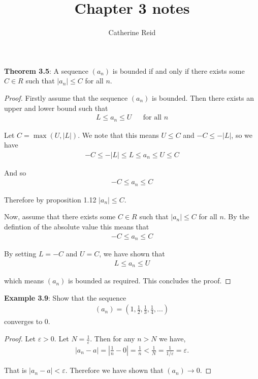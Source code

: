 \documentclass{article}
\author{Catherine Reid}
\title{Chapter 3 notes}
\date{}
\begin{document}
\maketitle

\textbf{Theorem 3.5}: A sequence $(a_n)$ is bounded if and only if there exists some $C \in R$ such that $|a_n| \leq C$ for all $n$.

\begin{proof}
	Firstly assume that the sequence $(a_n)$ is bounded. Then there exists an upper and lower bound such that
	\begin{align*}
		L \leq a_n \leq U &  & \text{for all }n
	\end{align*}

	Let $C = \max(U, |L|)$. We note that this means $U \leq C$ and $-C \leq -|L|$, so we have
	\begin{align*}
		-C \leq -|L| \leq L \leq a_n \leq U \leq C
	\end{align*}

	And so
	\begin{align*}
		-C \leq a_n \leq C
	\end{align*}

	Therefore by proposition 1.12 $|a_n| \leq C$.

	Now, assume that there exists some $C \in R$ such that $|a_n| \leq C$ for all $n$.  By the defintion of the absolute value this means that
	\begin{align*}
		-C \leq a_n \leq C
	\end{align*}

	By setting $L = -C$ and $U = C$, we have shown that
	\begin{align*}
		L \leq a_n \leq U
	\end{align*}

	which means $(a_n)$ is bounded as required. This concludes the proof.
\end{proof}

\textbf{Example 3.9}: Show that the sequence
\begin{align*}
	(a_n) = \left(1, \frac{1}{2}, \frac{1}{3}, \frac{1}{4},...\right)
\end{align*}
converges to 0.

\begin{proof}
	Let $\varepsilon > 0$. Let $N = \tfrac{1}{\varepsilon}$. Then for any $n > N$ we have,
	\begin{align*}
		|a_n - a| = |\frac{1}{n} - 0| = \frac{1}{n} < \frac{1}{N} = \frac{1}{1/\varepsilon} = \varepsilon.
	\end{align*}

	That is $|a_n - a| < \varepsilon$. Therefore we have shown that $(a_n) \rightarrow 0$.
\end{proof}
\end{document}
